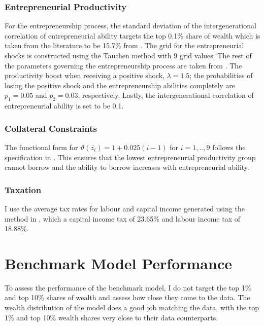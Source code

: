 \documentclass[12pt,a4paper]{article}
\begin{document}
\subsubsection*{ Entrepreneurial Productivity}
\hspace*{6mm} For the entrepreneurship process, the standard deviation of the intergenerational correlation of entrepreneurial ability targets the top 0.1\% share of wealth which is taken from the literature to be 15.7\% from \cite{smithzidarzwick}. The grid for the entrepreneurial shocks is constructed using the Tauchen method with 9 grid values. The rest of the parameters governing the entrepreneurship process are taken from \cite{GETAL}. The productivity boost when receiving a positive shock, $\lambda=1.5$; the probabilities of losing the positive shock and the entrepreneurship abilities completely are $p_1=0.05$ and $p_2=0.03$, respectively. Lastly, the intergenerational correlation of entrepreneurial ability is set to be 0.1.

\subsubsection*{Collateral Constraints}
\hspace*{6mm} The functional form for $\vartheta(\bar{z_i})=1+0.025(i-1)$ for $i=1,..,9$ follows the specification in \cite{GETAL}. This ensures that the lowest entrepreneurial productivity group cannot borrow and the ability to borrow increases with entrepreneurial ability.   

\subsubsection*{ Taxation}
\hspace*{6mm} I use the average tax rates for labour and capital income generated using the method in \cite{mcdaniel2007average}, which a capital income tax of 23.65\% and labour income tax of 18.88\%.

\section{Benchmark Model Performance}

\hspace*{6mm} To assess the performance of the benchmark model, I  do not target the top 1\% and top 10\% shares of wealth and assess how close they come to the data. The wealth distribution of the model does a good job matching the data, with the top 1\% and top 10\% wealth shares very close to their data counterparts.
\end{document}

